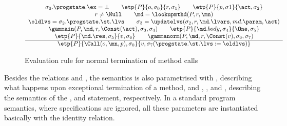 \begin{figure}[t]
\[
\begin{array}{c}
\sigma_0.\progstate.\ex = \bot \qquad        %
\etp{P}{o, \sigma_0}{r,\sigma_1} \qquad      %
\etp{P}{p, \sigma1}{\act, \sigma_2}\\        %
r \not= \Null \qquad                         %
\md = \lookupmthd(P, r, \mn) \\
\oldlvs = \sigma_2.\progstate.\st.\lvs \qquad
\sigma_3 = \updatelvs(\sigma_2, r, \md.\lvars, md.\param, \act) \\
\gammain(P, \md, r, \Const(\act), \sigma_3, \sigma_4) \qquad
\etp{P}{\md.body, \sigma_4}{\One,\sigma_5} \\
\etp{P}{\md.\res, \sigma_5}{v,\sigma_6}\qquad
\gammanorm(P, \md, r, \Const(v), \sigma_6, \sigma_7)\\
\hline
\etp{P}{\Call(o,\mn,p), \sigma_0}{v, \sigma_7
(\progstate.\st.\lvs := \oldlvs)}
\end{array}
\]
\caption{Evaluation rule for normal termination of method
calls}\label{FigEvalRules}
\end{figure}

Besides the relations \gammain and \gammanorm, the semantics
is also parametrised with
\gammaexc, describing what happens upon exceptional termination of a
method, and \deltaset, \deltacase, and \deltaassert, describing the
semantics of the \Set, \CaseJML and \Assert statement,
respectively. In a standard program semantics, where specifications
are ignored, all these parameters are instantiated basically with the
identity relation.



